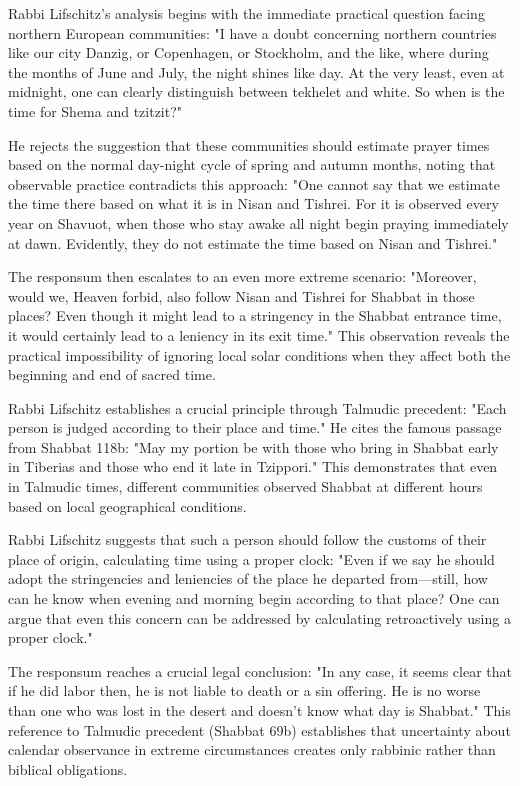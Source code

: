 Rabbi Lifschitz's analysis begins with the immediate practical question facing northern European communities: "I have a doubt concerning northern countries like our city Danzig, or Copenhagen, or Stockholm, and the like, where during the months of June and July, the night shines like day. At the very least, even at midnight, one can clearly distinguish between tekhelet and white. So when is the time for Shema and tzitzit?"

He rejects the suggestion that these communities should estimate prayer times based on the normal day-night cycle of spring and autumn months, noting that observable practice contradicts this approach: "One cannot say that we estimate the time there based on what it is in Nisan and Tishrei. For it is observed every year on Shavuot, when those who stay awake all night begin praying immediately at dawn. Evidently, they do not estimate the time based on Nisan and Tishrei."

The responsum then escalates to an even more extreme scenario: "Moreover, would we, Heaven forbid, also follow Nisan and Tishrei for Shabbat in those places? Even though it might lead to a stringency in the Shabbat entrance time, it would certainly lead to a leniency in its exit time." This observation reveals the practical impossibility of ignoring local solar conditions when they affect both the beginning and end of sacred time.

Rabbi Lifschitz establishes a crucial principle through Talmudic precedent: "Each person is judged according to their place and time." He cites the famous passage from Shabbat 118b: "May my portion be with those who bring in Shabbat early in Tiberias and those who end it late in Tzippori." This demonstrates that even in Talmudic times, different communities observed Shabbat at different hours based on local geographical conditions.

Rabbi Lifschitz suggests that such a person should follow the customs of their place of origin, calculating time using a proper clock: "Even if we say he should adopt the stringencies and leniencies of the place he departed from—still, how can he know when evening and morning begin according to that place? One can argue that even this concern can be addressed by calculating retroactively using a proper clock."

The responsum reaches a crucial legal conclusion: "In any case, it seems clear that if he did labor then, he is not liable to death or a sin offering. He is no worse than one who was lost in the desert and doesn't know what day is Shabbat." This reference to Talmudic precedent (Shabbat 69b) establishes that uncertainty about calendar observance in extreme circumstances creates only rabbinic rather than biblical obligations.

